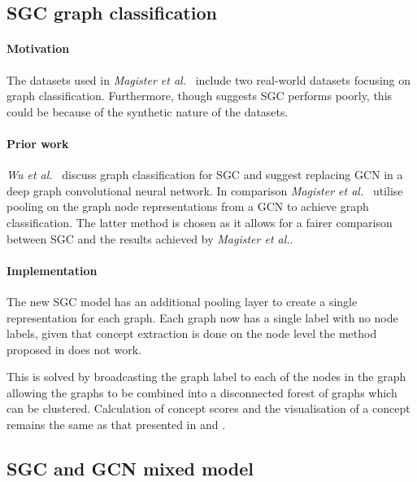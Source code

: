 \subsection{SGC graph classification}
\paragraph{Motivation}
The datasets used in \textit{Magister et al.}~\cite{magister2021gcexplainer} include two real-world datasets focusing on graph classification.
Furthermore, though  suggests SGC performs poorly, this could be because of the synthetic nature of the datasets.

\paragraph{Prior work}
\textit{Wu et al.}~\cite{wu2019simplifying} discuss graph classification for SGC and suggest replacing GCN in a deep graph convolutional neural network\cite{zhang2018end}.
In comparison \textit{Magister et al.}~\cite{magister2021gcexplainer} utilise pooling on the graph node representations from a GCN to achieve graph classification.
The latter method is chosen as it allows for a fairer comparison between SGC and the results achieved by \textit{Magister et al.}.

\paragraph{Implementation}
The new SGC model has an additional pooling layer to create a single representation for each graph.
Each graph now has a single label with no node labels, given that concept extraction is done on the node level the method proposed in  does not work.

This is solved by broadcasting the graph label to each of the nodes in the graph allowing the graphs to be combined into a disconnected forest of graphs which can be clustered.
Calculation of concept scores and the visualisation of a concept remains the same as that presented in  and .

\subsection{SGC and GCN mixed model}
\label{sec:SGCN}
